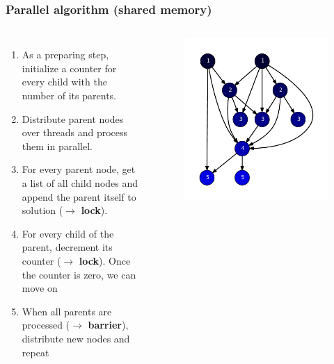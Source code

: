 \begin{frame}
\frametitle{Parallel algorithm (shared memory)}

\begin{columns}[c]
  \begin{enumerate}
    \item As a preparing step, initialize a counter for every child with the number of its parents.
    \item Distribute parent nodes over threads and process them in parallel.
    \item For every parent node, get a list of all child nodes and append the parent itself to solution ($\rightarrow$ \textbf{lock}).
    \item For every child of the parent, decrement its counter ($\rightarrow$ \textbf{lock}). Once the counter is zero, we can move on
    \item When all parents are processed ($\rightarrow$ \textbf{barrier}), distribute new nodes and repeat
  \end{enumerate}

  \begin{figure}[!ht]
    \begin{center}
      \includegraphics[width=\textwidth]{img/software10.pdf}
    \end{center}
  \end{figure}
\end{columns}

\end{frame}


